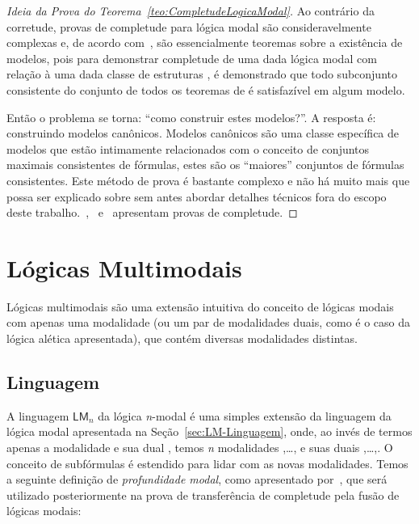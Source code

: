             \begin{proof}[Ideia da Prova do Teorema~\ref{teo:CompletudeLogicaModal}]
                Ao contrário da corretude, provas de completude para lógica modal são consideravelmente complexas e, de acordo com~,
                são essencialmente teoremas sobre a existência de modelos, pois para demonstrar completude de uma dada lógica modal  com relação
                à uma dada classe de estruturas , é demonstrado que todo subconjunto consistente do conjunto de todos os teoremas de 
                é satisfazível em algum modelo.

                Então o problema se torna: ``como construir estes modelos?''. A resposta é: construindo modelos canônicos. Modelos canônicos são uma classe
                específica de modelos que estão intimamente relacionados com o conceito de conjuntos maximais consistentes de fórmulas, estes são os ``maiores''
                conjuntos de fórmulas consistentes. Este método de prova é bastante complexo e não há muito mais que possa ser explicado sobre sem antes abordar
                detalhes técnicos fora do escopo deste trabalho.~,~ e~ apresentam provas de
                completude.
            \end{proof}

    \section{Lógicas Multimodais}
        \label{sec:LM-Multimodais}
        Lógicas multimodais são uma extensão intuitiva do conceito de lógicas modais com apenas uma modalidade (ou um par de modalidades duais, como é o caso da lógica
        alética apresentada), que contém diversas modalidades distintas.

        \subsection{Linguagem}
            \label{subsec:MultimodaisLinguagem}
            A linguagem \(\mathsf{LM}_{n}\) da lógica \textit{n}-modal é uma simples extensão da linguagem da lógica modal apresentada na Seção~\ref{sec:LM-Linguagem},
            onde, ao invés de termos apenas a modalidade \BOX e sua dual \DIA, temos \textit{n} modalidades ,\ldots, e suas duais ,\ldots,.
            O conceito de subfórmulas é estendido para lidar com as novas modalidades. Temos a seguinte definição de \textit{profundidade modal}, como
            apresentado por~, que será utilizado posteriormente na prova de transferência de completude pela fusão de lógicas modais:

